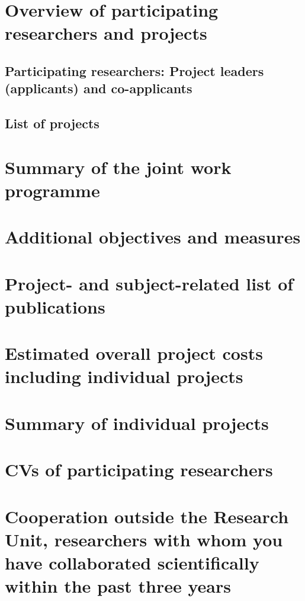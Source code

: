 \documentclass[english, 53.20]{proposal}
\begin{document}
\section{Overview of participating researchers and projects}

\subsection{Participating researchers: Project leaders (applicants) and co-applicants}

\subsection{List of projects}


\section{Summary of the joint work programme}


\section{Additional objectives and measures}


\section{Project- and subject-related list of publications}
\printbibliography[heading=none]


\section{Estimated overall project costs including individual projects}


\section{Summary of individual projects}


\section{CVs of participating researchers}


\section{Cooperation outside the Research Unit, researchers with whom you have collaborated scientifically within the past three years}
\end{document}
